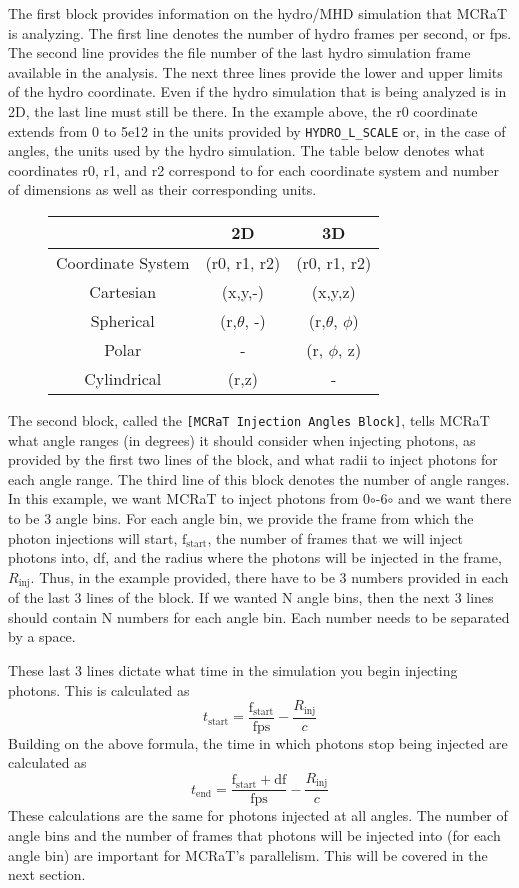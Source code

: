 \documentclass[12pt,a4paper]{article}
\begin{document}
The first block provides information on the hydro/MHD simulation that MCRaT is analyzing. The first line denotes the number of hydro frames per second, or fps. The second line provides the file number of the last hydro simulation frame available in the analysis. The next three lines provide the lower and upper limits of the hydro coordinate. Even if the hydro simulation that is being analyzed is in 2D, the last line must still be there. In the example above, the r0 coordinate extends from 0 to 5e12 in the units provided by \texttt{HYDRO\_L\_SCALE} or, in the case of angles, the units used by the hydro simulation. The table below denotes what coordinates r0, r1, and r2 correspond to for each coordinate system and number of dimensions as well as their corresponding units. 

\begin{figure}[h!]
\centering
\begin{tabular}{|c|c|c|}
\hline
 & 2D & 3D \\
\hline
Coordinate System & (r0, r1, r2) & (r0, r1, r2) \\
\hline
Cartesian & (x,y,-) & (x,y,z) \\
\hline
Spherical & (r,$\theta$, -) & (r,$\theta$, $\phi$) \\
\hline
Polar & - & (r, $\phi$, z) \\
\hline
Cylindrical & (r,z) & - \\
\hline
\end{tabular}
\end{figure}

The second block, called the \texttt{[MCRaT Injection Angles Block]}, tells MCRaT what angle ranges (in degrees) it should consider when injecting photons, as provided by the first two lines of the block, and what radii to inject photons for each angle range. The third line of this block denotes the number of angle ranges. In this example, we want MCRaT to inject photons from 0$\circ$-6$\circ$ and we want there to be 3 angle bins. For each angle bin, we provide the frame from which the photon injections will start, $\mathrm{f_{start}}$, the number of frames that we will inject photons into, df, and the radius where the photons will be injected in the frame, $R_\mathrm{inj}$. Thus, in the example provided, there have to be 3 numbers provided in each of the last 3 lines of the block. If we wanted N angle bins, then the next 3 lines should contain N numbers for each angle bin. Each number needs to be separated by a space.

These last 3 lines dictate what time in the simulation you begin injecting photons. This is calculated as 
\[
t_\mathrm{start}=\frac{\mathrm{f_{start}}}{\mathrm{fps}}-\frac{R_\mathrm{inj}}{c}
\]
Building on the above formula, the time in which photons stop being injected are calculated as
\[
t_\mathrm{end}=\frac{\mathrm{f_{start}}+\mathrm{df}}{\mathrm{fps}}-\frac{R_\mathrm{inj}}{c}
\]
These calculations are the same for photons injected at all angles. The number of angle bins and the number of frames that photons will be injected into (for each angle bin) are important for MCRaT's parallelism. This will be covered in the next section. 
\end{document}
